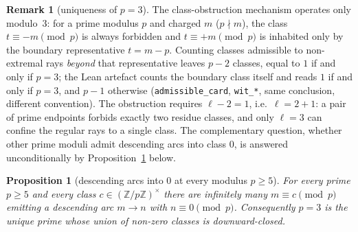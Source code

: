 \documentclass[11pt]{article}
\theoremstyle{plain}
\newtheorem{proposition}[theorem]{Proposition}
\theoremstyle{definition}
\newtheorem{remark}[theorem]{Remark}
\begin{document}
\begin{remark}[uniqueness of $p = 3$]\label{rem:p3}
The class-obstruction mechanism operates only modulo~$3$: for a
prime modulus $p$ and charged $m$ ($p \nmid m$), the class
$t \equiv -m \pmod p$ is always forbidden and
$t \equiv +m \pmod p$ is inhabited only by the boundary
representative $t = m - p$. Counting classes admissible to
non-extremal rays \emph{beyond} that representative leaves $p - 2$
classes, equal to $1$ if and only if $p = 3$; the Lean artefact
counts the boundary class itself and reads $1$ if and only if
$p = 3$, and $p - 1$ otherwise (\texttt{admissible\_card},
\texttt{wit\_*}, same conclusion, different convention). The
obstruction requires $\ell - 2 = 1$, i.e.\ $\ell = 2 + 1$: a pair of
prime endpoints forbids exactly two residue classes, and only
$\ell = 3$ can confine the regular rays to a single class. The
complementary question, whether other prime moduli admit descending
arcs into class $0$, is answered unconditionally by
Proposition~\ref{thm:pgates} below.
\end{remark}

\begin{proposition}[descending arcs into $0$ at every modulus
$p \ge 5$]\label{thm:pgates}
For every prime $p \ge 5$ and every class
$c \in (\mathbb{Z}/p\mathbb{Z})^{\times}$ there are infinitely
many $m \equiv c \pmod p$ emitting a descending arc $m \to n$
with $n \equiv 0 \pmod p$. Consequently $p = 3$ is the unique
prime whose union of non-zero classes is downward-closed.
\end{proposition}
\end{document}
